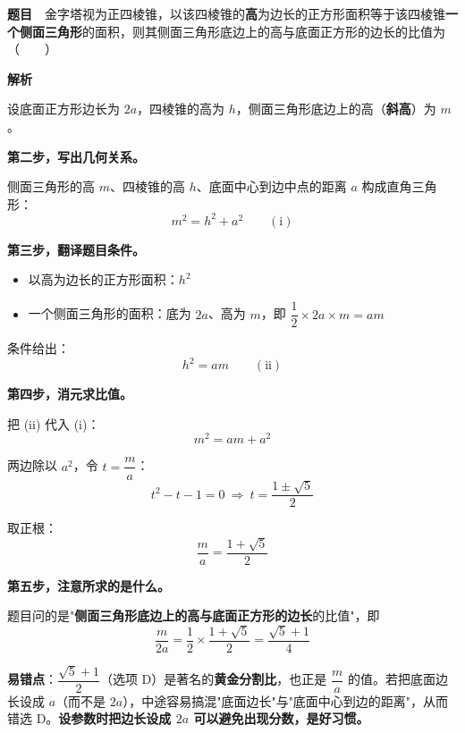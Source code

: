 \par\medskip


\textbf{题目}　金字塔视为正四棱锥，以该四棱锥的\textbf{高}为边长的正方形面积等于该四棱锥\textbf{一个侧面三角形}的面积，则其侧面三角形底边上的高与底面正方形的边长的比值为（　　）

\textbf{解析}


设底面正方形边长为 $2a$，四棱锥的高为 $h$，侧面三角形底边上的高（\textbf{斜高}）为 $m$。

\textbf{第二步，写出几何关系。}

侧面三角形的高 $m$、四棱锥的高 $h$、底面中心到边中点的距离 $a$ 构成直角三角形：
\[m^{2}=h^{2}+a^{2}\qquad(\text{i})\]

\textbf{第三步，翻译题目条件。}

\begin{itemize}
\item 以高为边长的正方形面积：$h^{2}$
\item 一个侧面三角形的面积：底为 $2a$、高为 $m$，即 $\dfrac12\times2a\times m=am$
\end{itemize}

条件给出：
\[h^{2}=am\qquad(\text{ii})\]

\textbf{第四步，消元求比值。}

把 (ii) 代入 (i)：
\[m^{2}=am+a^{2}\]

两边除以 $a^{2}$，令 $t=\dfrac ma$：
\[t^{2}-t-1=0\ \Longrightarrow\ t=\frac{1\pm\sqrt5}2\]

取正根：
\[\frac ma=\frac{1+\sqrt5}2\]

\textbf{第五步，注意所求的是什么。}

题目问的是"\textbf{侧面三角形底边上的高与底面正方形的边长}的比值"，即
\[\frac m{2a}=\frac12\times\frac{1+\sqrt5}2=\frac{\sqrt5+1}4\]


\begin{gktip}
\textbf{易错点}：$\dfrac{\sqrt5+1}2$（选项 D）是著名的\textbf{黄金分割比}，也正是 $\dfrac ma$ 的值。若把底面边长设成 $a$（而不是 $2a$），中途容易搞混"底面边长"与"底面中心到边的距离"，从而错选 D。\textbf{设参数时把边长设成 $2a$ 可以避免出现分数，是好习惯。}
\end{gktip}

\par\medskip


